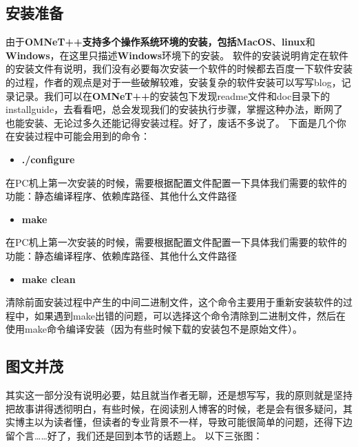 \subsection{安装准备}
\label{安装准备}

由于\textbf{OMNeT++\textbf{支持多个操作系统环境的安装，包括}MacOS}、\textbf{linux}和\textbf{Windows}，在这里只描述\textbf{Windows}环境下的安装。
软件的安装说明肯定在软件的安装文件有说明，我们没有必要每次安装一个软件的时候都去百度一下软件安装的过程，作者的观点是对于一些破解较难，安装复杂的软件安装可以写写blog，记录记录。我们可以在\textbf{OMNeT++}的安装包下发现readme文件和doc目录下的installguide，去看看吧，总会发现我们的安装执行步骤，掌握这种办法，断网了也能安装、无论过多久还能记得安装过程。好了，废话不多说了。
下面是几个你在安装过程中可能会用到的命令：

\begin{itemize}
\item \textbf{.\slash configure}

\end{itemize}

在PC机上第一次安装的时候，需要根据配置文件配置一下具体我们需要的软件的功能：静态编译程序、依赖库路径、其他什么文件路径

\begin{itemize}
\item \textbf{make}

\end{itemize}

在PC机上第一次安装的时候，需要根据配置文件配置一下具体我们需要的软件的功能：静态编译程序、依赖库路径、其他什么文件路径

\begin{itemize}
\item \textbf{make clean}

\end{itemize}

清除前面安装过程中产生的中间二进制文件，这个命令主要用于重新安装软件的过程中，如果遇到make出错的问题，可以选择这个命令清除到二进制文件，然后在使用make命令编译安装（因为有些时候下载的安装包不是原始文件）。

\subsection{图文并茂}
\label{图文并茂}

其实这一部分没有说明必要，姑且就当作者无聊，还是想写写，我的原则就是坚持把故事讲得透彻明白，有些时候，在阅读别人博客的时候，老是会有很多疑问，其实博主以为读者懂，但读者的专业背景不一样，导致可能很简单的问题，还得下边留个言{\ldots}{\ldots}好了，我们还是回到本节的话题上。
以下三张图：

